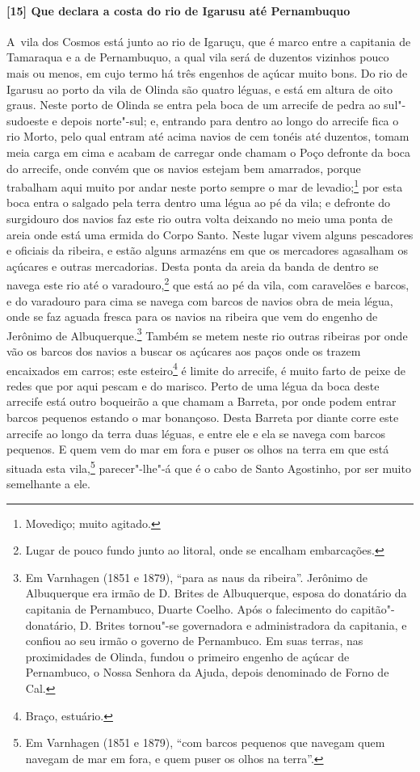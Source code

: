 \paragraph{[15] Que declara a costa do rio de Igarusu até Pernambuquo} \quad
\mbox{A vila} dos Cosmos está junto ao rio de Igaruçu, que é marco entre a capitania de Tamaraqua
e a de Pernambuquo, a qual vila será de duzentos vizinhos pouco mais ou menos, em cujo
termo há três engenhos de açúcar muito bons. Do rio de Igarusu ao porto da vila de Olinda
são quatro léguas, e está em altura de oito graus. Neste porto de Olinda se entra pela
boca de um arrecife de pedra ao sul"-sudoeste e depois norte"-sul; e, entrando para dentro
ao longo do arrecife fica o rio Morto, pelo qual entram até acima navios de cem tonéis até
duzentos, tomam meia carga em cima e acabam de carregar onde chamam o Poço defronte da
boca do arrecife, onde convém que os navios estejam bem amarrados, porque trabalham aqui
muito por andar neste porto sempre o mar de levadio;\footnote{ Movediço; muito agitado.}
por esta boca entra o salgado pela terra dentro uma légua ao pé da vila; e defronte do
surgidouro dos navios faz este rio outra volta deixando no meio uma ponta de areia onde
está uma ermida do Corpo Santo. Neste lugar vivem alguns pescadores e oficiais da ribeira,
e estão alguns armazéns em que os mercadores agasalham os açúcares e outras mercadorias.
Desta ponta da areia da banda de dentro se navega este rio até o varadouro,\footnote{ Lugar
de pouco fundo junto ao litoral, onde se encalham embarcações.} que está ao pé da vila,
com caravelões e barcos, e do varadouro para cima se navega com barcos de navios obra de
meia légua, onde se faz aguada fresca para os navios na ribeira que vem do engenho de
Jerônimo de Albuquerque.\footnote{ Em Varnhagen (1851 e 1879), ``para as naus da
ribeira''. Jerônimo de Albuquerque era irmão de D. Brites de Albuquerque, esposa do
donatário da capitania de Pernambuco, Duarte Coelho. Após o falecimento do
capitão"-donatário, D. Brites tornou"-se governadora e administradora da capitania, e
confiou ao seu irmão o governo de Pernambuco. Em suas terras, nas proximidades de Olinda,
fundou o primeiro engenho de açúcar de Pernambuco, o Nossa Senhora da Ajuda, depois
denominado de Forno de Cal.} Também se metem neste rio outras ribeiras por onde vão os
barcos dos navios a buscar os açúcares aos paços onde os trazem encaixados em carros; este
esteiro\footnote{ Braço, estuário.} é limite do arrecife, é muito farto de peixe de redes
que por aqui pescam e do marisco. Perto de uma légua da boca deste arrecife está outro
boqueirão a que chamam a Barreta, por onde podem entrar barcos pequenos estando o mar
bonançoso. Desta Barreta por diante corre este arrecife ao longo da terra duas léguas, e
entre ele e ela se navega com barcos pequenos. E quem vem do mar em fora e puser os olhos
na terra em que está situada esta vila,\footnote{ Em Varnhagen (1851 e 1879), ``com barcos
pequenos que navegam quem navegam de mar em fora, e quem puser os olhos na terra''.}
parecer"-lhe"-á que é o cabo de Santo Agostinho, por ser muito semelhante a ele.

